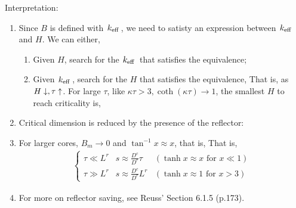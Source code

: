 \documentclass{school-22.211-notes}
\begin{document}
Interpretation:
\begin{enumerate}
\item Since $B$ is defined with $\left. k_{\mathrm{eff}} \right.$, 
  we need to satisty an expression between $\left. k_{\mathrm{eff}} \right.$ and $H$. We can either,
  \begin{enumerate}
  \item Given $H$, search for the $\left. k_{\mathrm{eff}} \right.$ that satisfies the equivalence;
  \item Given $\left. k_{\mathrm{eff}} \right.$, search for the $H$ that satisfies the equivalence,
    That is, as $H \downarrow, \tau \uparrow$. For large $\tau$, like $\kappa \tau > 3, \coth (\kappa \tau) \to 1$, the smallest $H$ to reach criticality is,
  \end{enumerate}
\item Critical dimension is reduced by the presence of the reflector: 
\item For larger cores, $B_m \to 0$ and $\tan^{-1} x \approx x $, that is, 
That is, 
\begin{align}
  \left\{ \begin{array}{ccc} 
    \tau \ll L^r & s \approx \frac{D^c}{D^r} \tau &  (\tanh x \approx x \mbox{ for }x\ll 1) \\
    \tau \gg L^r & s \approx \frac{D^c}{D^r} L^r &  (\tanh x \approx 1 \mbox{ for }x > 3) 
  \end{array} \right. 
\end{align}
\item For more on reflector saving, see Reuss' Section 6.1.5 (p.173). 
\end{enumerate}
\end{document}
